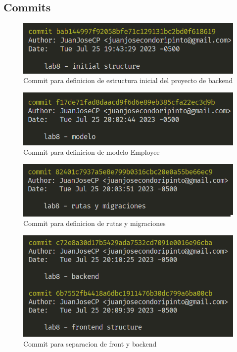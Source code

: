 \documentclass{article}
\begin{document}
    \subsection{Commits}
        \begin{figure}
            \centering
            \includegraphics{img/commit0.png}
            \caption{Commit para definicion de estructura inicial del proyecto de backend}
            \label{fig:enter-label}
        \end{figure}
        \begin{figure}
            \centering
            \includegraphics{img/commit1.png}
            \caption{Commit para definicion de modelo Employee}
            \label{fig:enter-label}
        \end{figure}
        \begin{figure}
            \centering
            \includegraphics{img/commit2.png}
            \caption{Commit para definicion de rutas y migraciones}
            \label{fig:enter-label}
        \end{figure}
        \begin{figure}
            \centering
            \includegraphics{img/commit3.png}
            \caption{Commit para separacion de front y backend}
            \label{fig:enter-label}
        \end{figure}
\end{document}
